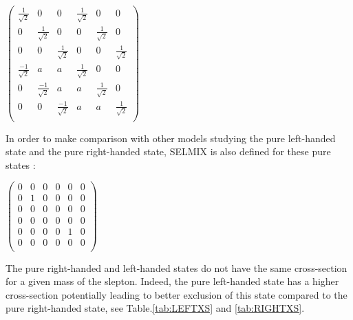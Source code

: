 \documentclass{cernatlasnote}
\begin{document}
\begin{center}
     $\begin{pmatrix}
  \frac{1}{\sqrt{2}} & 0 & 0 & \frac{1}{\sqrt{2}} & 0 & 0 \\ 
  0 & \frac{1}{\sqrt{2}} & 0 & 0 & \frac{1}{\sqrt{2}} & 0  \\
  0 & 0 & \frac{1}{\sqrt{2}} & 0 & 0 & \frac{1}{\sqrt{2}} \\
  \frac{-1}{\sqrt{2}} & a & a & \frac{1}{\sqrt{2}} & 0 & 0  \\
  0 & \frac{-1}{\sqrt{2}} & a & a & \frac{1}{\sqrt{2}} & 0  \\
  0 & 0 & \frac{-1}{\sqrt{2}} & a & a & \frac{1}{\sqrt{2}}  \\
\end{pmatrix}$
\end{center}

In order to make comparison with other models studying the pure left-handed state and the pure right-handed state, SELMIX is also defined for these pure states :

\begin{center}
     $\begin{pmatrix}
  0 & 0 & 0 & 0 & 0 & 0 \\ 
  0 & 1 & 0 & 0 & 0 & 0  \\
  0 & 0 & 0 & 0 & 0 & 0  \\
  0 & 0 & 0 & 0 & 0 & 0  \\
  0 & 0 & 0 & 0 & 1 & 0  \\
  0 & 0 & 0 & 0 & 0 & 0  \\
\end{pmatrix}$
\end{center}
 The pure right-handed and left-handed states do not have the same cross-section for a given mass of the slepton. Indeed, the pure left-handed state has a higher cross-section potentially leading to better exclusion of this state compared to the pure right-handed state, see Table.\ref{tab:LEFTXS} and \ref{tab:RIGHTXS}. \\
\end{document}
